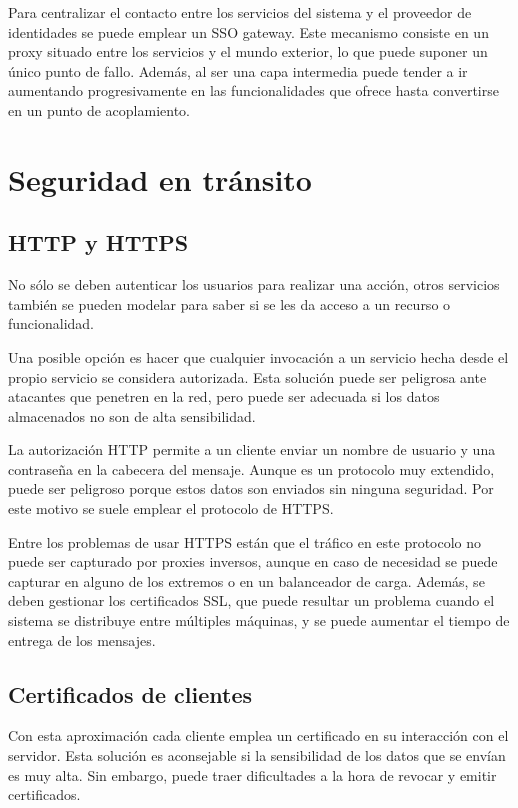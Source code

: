 \documentclass[11pt,a4paper]{article}
\begin{document}
Para centralizar el contacto entre los servicios del sistema y el proveedor de identidades se puede emplear un SSO gateway. Este mecanismo consiste en un proxy situado entre los servicios y el mundo exterior, lo que puede suponer un único punto de fallo. Además, al ser una capa intermedia puede tender a ir aumentando progresivamente en las funcionalidades que ofrece hasta convertirse en un punto de acoplamiento.

\section{Seguridad en tránsito}

\subsection{HTTP y HTTPS}

No sólo se deben autenticar los usuarios para realizar una acción, otros servicios también se pueden modelar para saber si se les da acceso a un recurso o funcionalidad. 

Una posible opción es hacer que cualquier invocación a un servicio hecha desde el propio servicio se considera autorizada. Esta solución puede ser peligrosa ante atacantes que penetren en la red, pero puede ser adecuada si los datos almacenados no son de alta sensibilidad.

La autorización HTTP permite a un cliente enviar un nombre de usuario y una contraseña en la cabecera del mensaje. Aunque es un protocolo muy extendido, puede ser peligroso porque estos datos son enviados sin ninguna seguridad. Por este motivo se suele emplear el protocolo de HTTPS.

Entre los problemas de usar HTTPS están que el tráfico en este protocolo no puede ser capturado por proxies inversos, aunque en caso de necesidad se puede capturar en alguno de los extremos o en un balanceador de carga. Además, se deben gestionar los certificados SSL, que puede resultar un problema cuando el sistema se distribuye entre múltiples máquinas, y se puede aumentar el tiempo de entrega de los mensajes.

\subsection{Certificados de clientes}

Con esta aproximación cada cliente emplea un certificado en su interacción con el servidor. Esta solución es aconsejable si la sensibilidad de los datos que se envían es muy alta. Sin embargo, puede traer dificultades a la hora de revocar y emitir certificados.
\end{document}
